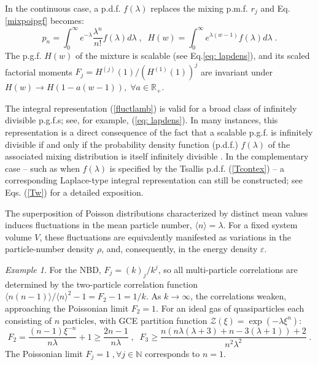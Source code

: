 \documentclass[a4paper,12pt]{amsart}
\newcommand{\N}{\mathbb{N}}
\newcommand{\R}{\mathbb{R}_{+}}
\theoremstyle{definition}
\theoremstyle{remark}
\newtheorem{Example}{Example}[section]
\begin{document}
In the continuous case, a p.d.f. $f(\lambda)$ replaces the mixing p.m.f. $r_j$ and  Eq.\ref{mixpoipgf} becomes:
\begin{equation}\label{fluctlamb}
p_n= \int_0^{\infty} e^{-\lambda}\frac{\lambda^n}{n!}f(\lambda) d\lambda\;,\;\; H(w)=\int_0^{\infty}e^{\lambda(w-1)} f(\lambda) d\lambda\;.    
\end{equation}
The p.g.f. $H(w)$ of the mixture is scalable (see Eq.\ref{eq: lapdens}), and its scaled factorial moments $F_j=H^{(j)}(1)/(H^{(1)}(1))^j$ are invariant under $H(w)\to H(1-a(w-1)),\;\forall a\in \R$. 

The integral representation (\ref{fluctlamb}) is valid for a broad class of infinitely divisible p.g.f.s; see, for example, (\ref{eq: lapdens}). In many instances, this representation is a direct consequence of the fact that a scalable p.g.f. is infinitely divisible if and only if the probability density function (p.d.f.) $f(\lambda)$ of the associated mixing distribution is itself infinitely divisible \cite{StvH2004}. In the complementary case -- such as when $f(\lambda)$ is specified by the Tsallis p.d.f. (\ref{Tcontex}) -- a corresponding Laplace-type integral representation can still be constructed; see Eqs. (\ref{Tw}) for a detailed exposition.

The superposition of Poisson distributions characterized by distinct mean values induces fluctuations in the mean particle number, $\langle n \rangle = \lambda$. For a fixed system volume $V$, these fluctuations are equivalently manifested as variations in the particle-number density $\rho$, and, consequently, in the energy density $\varepsilon$.
\begin{Example}
For the NBD, $F_j=(k)_j/k^j$, so all multi-particle correlations are determined by the two-particle correlation function $\langle n(n-1)\rangle/ \langle n \rangle^2 -1=F_2-1 =1/k$. As $k\to \infty$, the correlations weaken, approaching the Poissonian limit $F_2=1$. For an ideal gas of quasiparticles each consisting of $n$ particles, with GCE partition function $\mathcal{Z}(\xi)=\exp(-\lambda \xi^{n})$:
\begin{equation}\label{facmom_n-tup}
 F_2=\frac{(n-1) \xi ^{-n}}{n \lambda}+1\geq \frac{2n-1}{n \lambda}\;,\;\; 
F_3\geq \frac{n (n \lambda  (\lambda +3)+n-3 (\lambda +1))+2}{n^2 \lambda ^2}\;.   
\end{equation}
The Poissonian limit $F_j=1\;, \forall j\in\N$  corresponds to $n=1$.

\end{Example}
\end{document}
